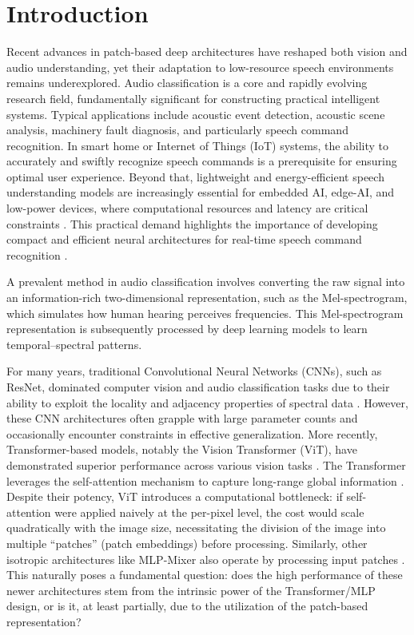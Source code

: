 \section*{Introduction}

Recent advances in patch-based deep architectures have reshaped both vision and audio understanding, yet their adaptation to low-resource speech environments remains underexplored.
Audio classification is a core and rapidly evolving research field, fundamentally significant for constructing practical intelligent systems.
Typical applications include acoustic event detection, acoustic scene analysis, machinery fault diagnosis, and particularly speech command recognition.
In smart home or Internet of Things (IoT) systems, the ability to accurately and swiftly recognize speech commands is a prerequisite for ensuring optimal user experience.
Beyond that, lightweight and energy-efficient speech understanding models are increasingly essential for embedded AI, edge-AI, and low-power devices, where computational resources and latency are critical constraints \cite{lin2018edgespeechnetshighlyefficientdeep,howard2019searchingmobilenetv3,Wong2020TinySpeechAC}.
This practical demand highlights the importance of developing compact and efficient neural architectures for real-time speech command recognition \cite{9606720}.

A prevalent method in audio classification involves converting the raw signal into an information-rich two-dimensional representation, such as the Mel-spectrogram, which simulates how human hearing perceives frequencies.
This Mel-spectrogram representation is subsequently processed by deep learning models to learn temporal–spectral patterns.

For many years, traditional Convolutional Neural Networks (CNNs), such as ResNet, dominated computer vision and audio classification tasks due to their ability to exploit the locality and adjacency properties of spectral data \cite{Wightman2021ResNet}.
However, these CNN architectures often grapple with large parameter counts and occasionally encounter constraints in effective generalization.
More recently, Transformer-based models, notably the Vision Transformer (ViT), have demonstrated superior performance across various vision tasks \cite{dosovitskiy2020image}.
The Transformer leverages the self-attention mechanism to capture long-range global information \cite{zhu2023multiscaleaudiospectrogramtransformer,gong2021astaudiospectrogramtransformer,Koutini_2022}.
Despite their potency, ViT introduces a computational bottleneck: if self-attention were applied naively at the per-pixel level, the cost would scale quadratically with the image size, necessitating the division of the image into multiple “patches” (patch embeddings) before processing.
Similarly, other isotropic architectures like MLP-Mixer also operate by processing input patches \cite{Tolstikhin2021MLPMixer,liu2022convnet2020s,mehta2022mobilevitlightweightgeneralpurposemobilefriendly}.
This naturally poses a fundamental question: does the high performance of these newer architectures stem from the intrinsic power of the Transformer/MLP design, or is it, at least partially, due to the utilization of the patch-based representation?

